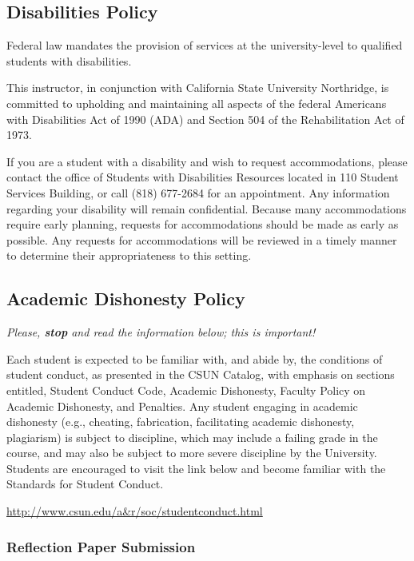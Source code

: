 \documentclass[11pt,]{article}
\begin{document}
\hypertarget{disabilities-policy}{%
\subsection{Disabilities Policy}\label{disabilities-policy}}

Federal law mandates the provision of services at the university-level
to qualified students with disabilities.

This instructor, in conjunction with California State University
Northridge, is committed to upholding and maintaining all aspects of the
federal Americans with Disabilities Act of 1990 (ADA) and Section 504 of
the Rehabilitation Act of 1973.

If you are a student with a disability and wish to request
accommodations, please contact the office of Students with Disabilities
Resources located in 110 Student Services Building, or call (818)
677-2684 for an appointment. Any information regarding your disability
will remain confidential. Because many accommodations require early
planning, requests for accommodations should be made as early as
possible. Any requests for accommodations will be reviewed in a timely
manner to determine their appropriateness to this setting.

\hypertarget{academic-dishonesty-policy}{%
\subsection{Academic Dishonesty
Policy}\label{academic-dishonesty-policy}}

\emph{Please, \textbf{stop} and read the information below; this is
important!}

Each student is expected to be familiar with, and abide by, the
conditions of student conduct, as presented in the CSUN Catalog, with
emphasis on sections entitled, Student Conduct Code, Academic
Dishonesty, Faculty Policy on Academic Dishonesty, and Penalties. Any
student engaging in academic dishonesty (e.g., cheating, fabrication,
facilitating academic dishonesty, plagiarism) is subject to discipline,
which may include a failing grade in the course, and may also be subject
to more severe discipline by the University. Students are encouraged to
visit the link below and become familiar with the Standards for Student
Conduct.

\url{http://www.csun.edu/a\&r/soc/studentconduct.html}

\hypertarget{reflection-paper-submission}{%
\subsubsection{Reflection Paper
Submission}\label{reflection-paper-submission}}
\end{document}
